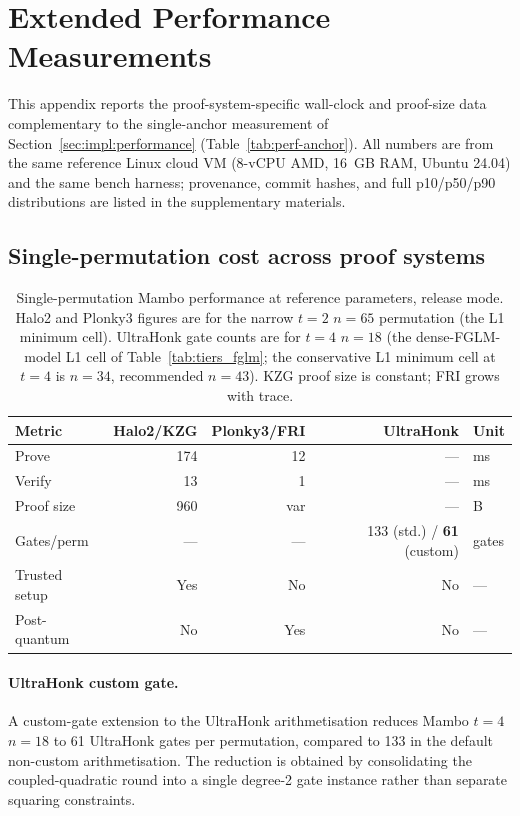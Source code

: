 \documentclass[11pt,a4paper]{article}
\theoremstyle{definition}
\begin{document}
\section{Extended Performance Measurements}\label{app:extended-perf}

This appendix reports the proof-system-specific wall-clock and
proof-size data complementary to the single-anchor measurement of
Section~\ref{sec:impl:performance} (Table~\ref{tab:perf-anchor}).
All numbers are from the same reference Linux cloud VM (8-vCPU AMD,
16~GB RAM, Ubuntu 24.04) and the same bench harness; provenance,
commit hashes, and full p10/p50/p90 distributions are listed in the
supplementary materials.

\subsection{Single-permutation cost across proof systems}

\begin{table}[H]
\centering
\caption{Single-permutation Mambo performance at reference parameters,
release mode. Halo2 and Plonky3 figures are for the narrow $t=2$
$n=65$ permutation (the L1 minimum cell). UltraHonk gate counts are
for $t=4$ $n=18$
(the dense-FGLM-model L1 cell of Table~\ref{tab:tiers_fglm}; the
conservative L1 minimum cell at $t=4$ is $n=34$, recommended
$n=43$). KZG proof size is constant;
FRI grows with trace.}
\label{tab:perf-single}
\small
\begin{tabular}{@{}lrrrl@{}}
\toprule
Metric & Halo2/KZG & Plonky3/FRI & UltraHonk & Unit \\
\midrule
Prove         & 174 & 12  & --- & ms \\
Verify        & 13  & 1   & --- & ms \\
Proof size    & 960 & var & --- & B \\
Gates/perm    & --- & --- & 133 (std.) / \textbf{61} (custom) & gates \\
Trusted setup & Yes & No  & No  & --- \\
Post-quantum  & No  & Yes & No  & --- \\
\bottomrule
\end{tabular}
\end{table}

\paragraph{UltraHonk custom gate.}
A custom-gate extension to the UltraHonk arithmetisation reduces Mambo
$t=4$ $n=18$ to 61 UltraHonk gates per permutation, compared to 133 in
the default non-custom arithmetisation. The reduction is obtained by
consolidating the coupled-quadratic round into a single degree-2 gate
instance rather than separate squaring constraints.
\end{document}
